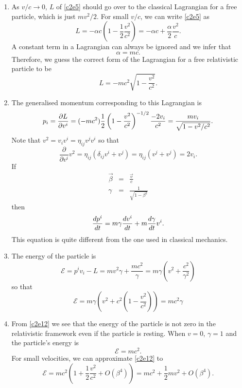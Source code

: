 \begin{enumerate}
\item As $v/c \rightarrow 0$, $L$ of \eqref{c2e5} should go over to the 
classical Lagrangian for a free particle, which is just $mv^2/2$. For small 
$v/c$, we can write \eqref{c2e5} as
\[
L = -\alpha c\left(1 - \frac{1}{2}\frac{v^2}{c^2}\right) = 
-\alpha c + \frac{\alpha}{2}\frac{v^2}{c}.
\]
A constant term in a Lagrangian can always be ignored and we infer that
\begin{equation}\label{c2e6}
\alpha = mc.
\end{equation}
Therefore, we guess the correct form of the Lagrangian for a free relativistic
particle to be
\begin{equation}\label{c2e7}
L = -mc^2\sqrt{1 - \frac{v^2}{c^2}}.
\end{equation}

\item The generalised momentum corresponding to this Lagrangian is
\begin{equation}\label{c2e8}
p_i = \frac{\partial{L}}{\partial{v^i}} = (-mc^2)\frac{1}{2}\left(1 - \frac{v^2}{c^2}\right)^{-1/2}
\frac{-2v_i}{c^2} = \frac{mv_i}{\sqrt{1 - v^2/c^2}}.
\end{equation}
Note that $v^2 = v_iv^i = \eta_{ij}v^jv^i$ so that
\[
\frac{\partial}{\partial v^i}v^2 = \eta_{ij}(\delta_{ij}v^i + v^j) = \eta_{ij}
(v^j + v^j) = 2v_i.
\]
If
\begin{eqnarray}
\vec\beta &=& \frac{\vec{v}}{c} \\ \label{c2e9}
\gamma &=& \frac{1}{\sqrt{1 - \beta^2}} \label{c2e10}
\end{eqnarray}
then
\begin{equation}\label{c2e11}
\frac{d{p^i}}{d{t}} = m\gamma \frac{d{v^i}}{d{t}} + m\frac{d{\gamma}}{d{t}}v^i.
\end{equation}
This equation is quite different from the one used in classical mechanics.

\item The energy of the particle is
\[
\mathcal{E} = p^i v_i - L = mv^2\gamma + \frac{mc^2}{\gamma} = m\gamma
\left(v^2 + \frac{c^2}{\gamma^2}\right)
\]
so that
\begin{equation}\label{c2e12}
\mathcal{E} = m\gamma\left(v^2 + c^2\left(1 - \frac{v^2}{c^2}\right)\right) 
= mc^2\gamma
\end{equation}

\item From \eqref{c2e12} we see that the energy of the particle is not zero in
the relativistic framework even if the particle is resting. When $v = 0$, 
$\gamma = 1$ and the particle's energy is
\begin{equation}\label{c2e13}
\mathcal{E} = mc^2.
\end{equation}
For small velocities, we can approximate \eqref{c2e12} to
\begin{equation}\label{c2e14}
\mathcal{E} = mc^2\left(1 + \frac{1}{2}\frac{v^2}{c^2} + O(\beta^4)\right) = 
mc^2 + \frac{1}{2}mv^2 + O(\beta^4).
\end{equation}


\end{enumerate}
